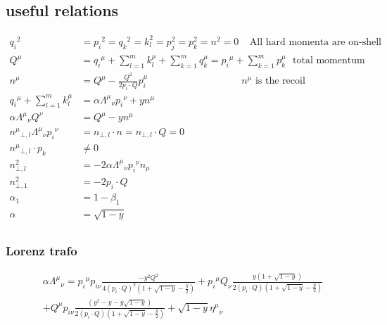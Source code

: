 \subsection{useful relations}
\begin{equation}
	\begin{aligned}
	{q_i}^{2} &= {p_i}^2={q_k}^{2}= k_l^2=p_j^2=p_k^2=n^2=0 \:\:\:\:\:\text{All hard momenta are on-shell} \\
	{Q}^{\mu} &= {q_i}^{\mu}+\displaystyle\sum\limits_{l=1}^m k_l^{\mu}+\displaystyle\sum\limits_{k=1}^m q_k^{\mu}={p_i}^{\mu}+\displaystyle\sum\limits_{k=1}^m p_k^{\mu} \:\:\:\text{total momentum }\\
    {n}^{\mu} &= {Q}^{\mu}-\frac{Q^2}{2p_i\cdot Q}p_i^{\mu}\:\:\:\:\:\:\:\:\:\:\:\:\:\:\:\:\:\:\:\:\:\:\:\:\:\:\:\:\:\:\:\:\:\:\:\:\:\:\:\:\:\:\:\text{${n}^{\mu}$ is the recoil}\\
	{q_i}^{\mu} +\displaystyle\sum\limits_{l=1}^m k_l^{\mu}   &= \alpha{\Lambda^{\mu}}_{\nu}{p_i}^{\nu} +y{n}^{\mu}\\
	\alpha{\Lambda^{\mu}}_{\nu}{Q}^{\nu} &= {Q}^{\mu}-yn^{\mu}\\
	{n^{\mu}}_{\bot,l}{\Lambda^{\mu}}_{\nu}{p_i}^{\nu} &= {n_{\bot,l}} \cdot n = {n_{\bot,l}} \cdot Q =0\\
	{n^{\mu}}_{\bot,l}\cdot p_k &\neq0\\
	{n}^2_{\bot,l} &= -2\alpha{\Lambda^{\mu}}_{\nu}{p_i}^{\nu} n_{\mu}\\
	{n}^2_{\bot,1} &= -2p_i\cdot Q\\
	\alpha_1&=1-\beta_1 \\
	\alpha&=\sqrt{1-y} \\	
    \end{aligned}
\end{equation}

\subsubsection*{Lorenz trafo}

\begin{equation}
	\begin{aligned}
	\alpha{\Lambda^{\mu}}_{\nu} = {p_i}^{\mu} p_{i\nu} \frac{-y^2 Q^2}{4(p_i\cdot Q)^2(1+\sqrt{1-y}-\frac{y}{2})}
	+{p_i}^{\mu} Q_{\nu} \frac{y(1+\sqrt{1-y})}{2(p_i\cdot Q)(1+\sqrt{1-y}-\frac{y}{2})}\\
	+{Q}^{\mu} p_{i\nu} \frac{(y^2 -y-y\sqrt{1-y})}{2(p_i\cdot Q)(1+\sqrt{1-y}-\frac{y}{2})}+\sqrt{1-y} {\eta^{\mu}}_{\nu}\\
    \end{aligned}
\end{equation}

